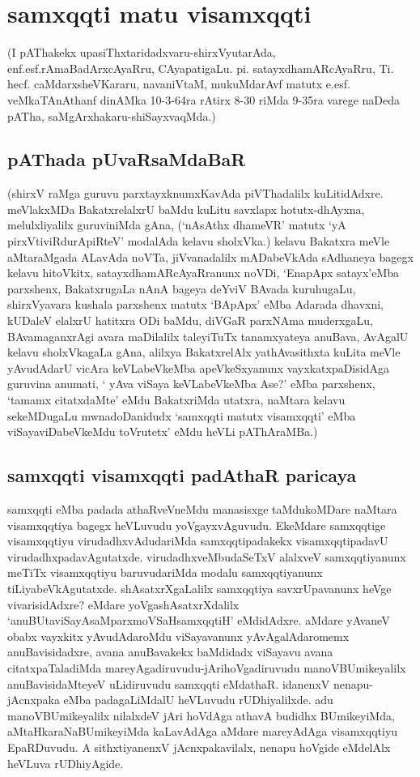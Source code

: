 \chapter{samxqqti matu visamxqqti}

(I pAThakekx upasiThxtaridadxvaru-shirxVyutarAda, enf.esf.rAmaBadArxcAyaRru, CAyapatigaLu. pi. satayxdhamARcAyaRru, Ti. hecf. caMdarxsheVKararu, navaniVtaM, mukuMdarAvf matutx e.esf. veMkaTAnAthanf dinAMka 10-3-64ra rAtirx 8-30 riMda 9-35ra varege naDeda pATha, saMgArxhakaru-shiSayxvaqMda.)

\section*{pAThada pUvaRsaMdaBaR}

(shirxV raMga guruvu parxtayxknumxKavAda piVThadalilx kuLitidAdxre. meVlakxMDa BakatxrelalxrU baMdu kuLitu savxlapx hotutx-dhAyxna, melulxliyalilx guruviniMda gAna, (`nAsAthx dhameVR' matutx `yA pirxVtiviRdurApiRteV' modalAda kelavu sholxVka.) kelavu Bakatxra meVle aMtaraMgada ALavAda noVTa, jiVvanadalilx mADabeVkAda sAdhaneya bagegx kelavu hitoVkitx, satayxdhamARcAyaRranunx noVDi, `EnapApx satayx'eMba parxshenx, BakatxrugaLa nAnA bageya deYviV BAvada kuruhugaLu, shirxVyavara kushala parxshenx matutx `BApApx' eMba Adarada dhavxni, kUDaleV elalxrU hatitxra ODi baMdu, diVGaR parxNAma muderxgaLu, BAvamaganxrAgi avara maDilalilx taleyiTuTx tanamxyateya anuBava, AvAgalU kelavu sholxVkagaLa gAna, alilxya BakatxrelAlx yathAvasithxta kuLita meVle yAvudAdarU vicAra keVLabeVkeMba apeVkeSxyanunx vayxkatxpaDisidAga guruvina anumati, ` yAva viSaya keVLabeVkeMba Ase?' eMba parxshenx, `tamamx citatxdaMte' eMdu BakatxriMda utatxra, naMtara kelavu sekeMDugaLu mwnadoDanidudx  `samxqqti matutx visamxqqti' eMba viSayaviDabeVkeMdu toVrutetx' eMdu heVLi pAThAraMBa.)

\section*{samxqqti visamxqqti padAthaR paricaya}

samxqqti eMba padada athaRveVneMdu manasisxge taMdukoMDare naMtara visamxqqtiya bagegx heVLuvudu yoVgayxvAguvudu. EkeMdare samxqqtige visamxqqtiyu virudadhxvAdudariMda samxqqtipadakekx visamxqqtipadavU virudadhxpadavAgutatxde. virudadhxveMbudaSeTxV alalxveV samxqqtiyanunx meTiTx visamxqqtiyu baruvudariMda modalu samxqqtiyanunx tiLiyabeVkAgutatxde. shAsatxrXgaLalilx samxqqtiya savxrUpavanunx heVge vivarisidAdxre? eMdare yoVgashAsatxrXdalilx `anuBUtaviSayAsaMparxmoVSaHsamxqqtiH'\label{81} eMdidAdxre. aMdare yAvaneV obabx vayxkitx yAvudAdaroMdu viSayavanunx yAvAgalAdaromemx anuBavisidadxre, avana anuBavakekx baMdidadx viSayavu avana citatxpaTaladiMda mareyAgadiruvudu-jArihoVgadiruvudu manoVBUmikeyalilx anuBavisidaMteyeV uLidiruvudu samxqqti eMdathaR. idanenxV nenapu-jAcnxpaka eMba padagaLiMdalU heVLuvudu rUDhiyalilxde. adu manoVBUmikeyalilx nilalxdeV jAri hoVdAga athavA budidhx BUmikeyiMda, aMtaHkaraNaBUmikeyiMda kaLavAdAga aMdare mareyAdAga visamxqqtiyu EpaRDuvudu. A sithxtiyanenxV jAcnxpakavilalx, nenapu hoVgide eMdelAlx heVLuva rUDhiyAgide.

